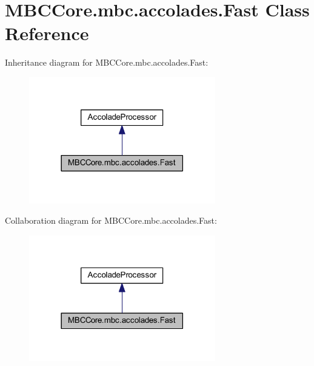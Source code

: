 \hypertarget{class_m_b_c_core_1_1mbc_1_1accolades_1_1_fast}{\section{M\-B\-C\-Core.\-mbc.\-accolades.\-Fast Class Reference}
\label{class_m_b_c_core_1_1mbc_1_1accolades_1_1_fast}
}


Inheritance diagram for M\-B\-C\-Core.\-mbc.\-accolades.\-Fast\-:\nopagebreak
\begin{figure}[H]
\begin{center}
\leavevmode
\includegraphics[width=230pt]{class_m_b_c_core_1_1mbc_1_1accolades_1_1_fast__inherit__graph}
\end{center}
\end{figure}


Collaboration diagram for M\-B\-C\-Core.\-mbc.\-accolades.\-Fast\-:\nopagebreak
\begin{figure}[H]
\begin{center}
\leavevmode
\includegraphics[width=230pt]{class_m_b_c_core_1_1mbc_1_1accolades_1_1_fast__coll__graph}
\end{center}
\end{figure}
